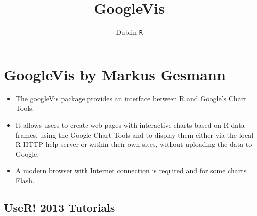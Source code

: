 \documentclass[]{article}
\title{GoogleVis}
\author{Dublin \texttt{R}}
\begin{document}
\maketitle

\begin{abstract}

\end{abstract}

\section{GoogleVis by Markus Gesmann}




\begin{itemize}
\item The googleVis package provides an interface between R and Google's Chart Tools. 

\item It allows users to create web pages with interactive charts based on R data frames, using the Google Chart Tools and to 
display them either via the local R HTTP help server or within their own sites, without uploading the data to Google. 

\item A modern browser with Internet connection is required and for some charts Flash.
\end{itemize}
\subsection{UseR! 2013 Tutorials}
\end{document}
